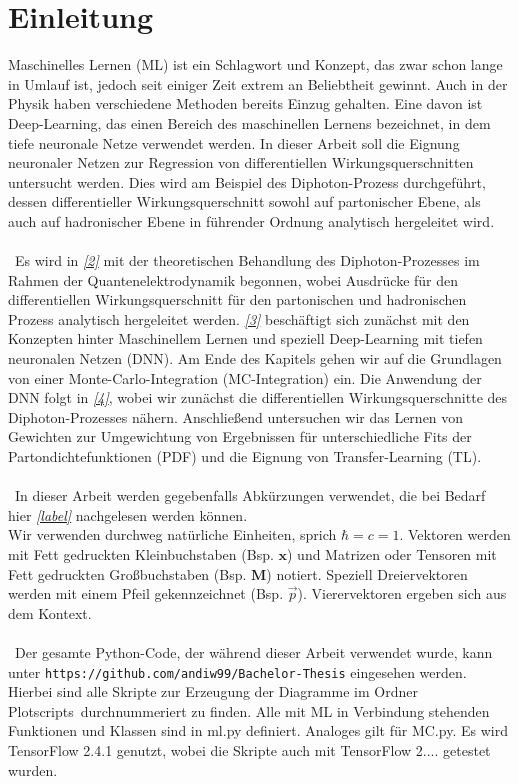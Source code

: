 
%
%
\chapter{Einleitung}
Maschinelles Lernen (ML) ist ein Schlagwort und Konzept, das zwar schon lange in Umlauf ist, jedoch seit einiger Zeit extrem an Beliebtheit gewinnt. Auch in der Physik haben verschiedene Methoden bereits Einzug gehalten. Eine davon ist Deep-Learning, das einen Bereich des maschinellen Lernens bezeichnet, in dem tiefe neuronale Netze verwendet werden. In dieser Arbeit soll die Eignung neuronaler Netzen zur Regression von differentiellen Wirkungsquerschnitten untersucht werden. Dies wird am Beispiel des Diphoton-Prozess durchgeführt, dessen differentieller Wirkungsquerschnitt sowohl auf partonischer Ebene, als auch auf hadronischer Ebene in führender Ordnung analytisch hergeleitet wird.\\
\\\
Es wird in \textit{\autoref{2}} mit der theoretischen Behandlung des Diphoton-Prozesses im Rahmen der Quantenelektrodynamik begonnen, wobei Ausdrücke für den differentiellen Wirkungsquerschnitt für den partonischen und hadronischen Prozess analytisch hergeleitet werden. \textit{\autoref{3}} beschäftigt sich zunächst mit den Konzepten hinter Maschinellem Lernen und speziell Deep-Learning mit tiefen neuronalen Netzen (DNN). Am Ende des Kapitels gehen wir auf die Grundlagen von einer Monte-Carlo-Integration (MC-Integration) ein. Die Anwendung der DNN folgt in \textit{\autoref{4}}, wobei wir zunächst die differentiellen Wirkungsquerschnitte des Diphoton-Prozesses nähern. Anschließend untersuchen wir das Lernen von Gewichten zur Umgewichtung von Ergebnissen für unterschiedliche Fits der Partondichtefunktionen (PDF) und die Eignung von Transfer-Learning (TL). \\
\\\
In dieser Arbeit werden gegebenfalls Abkürzungen verwendet, die bei Bedarf hier \textit{\autoref{label}} nachgelesen werden können. \\
Wir verwenden durchweg natürliche Einheiten, sprich $\hbar = c = 1$. Vektoren werden mit Fett gedruckten Kleinbuchstaben (Bsp. $\mathbf{x}$) und Matrizen oder Tensoren mit Fett gedruckten Großbuchstaben (Bsp. $\mathbf{M}$) notiert. Speziell Dreiervektoren werden mit einem Pfeil gekennzeichnet (Bsp. $\vec{p}$). Vierervektoren ergeben sich aus dem Kontext. \\
\\\
Der gesamte Python-Code, der während dieser Arbeit verwendet wurde, kann unter \texttt{https://github.com/andiw99/Bachelor-Thesis} eingesehen werden. Hierbei sind alle Skripte zur Erzeugung der Diagramme im Ordner \glqq Plotscripts\grqq~durchnummeriert zu finden. Alle mit ML in Verbindung stehenden Funktionen und Klassen sind in ml.py definiert. Analoges gilt für MC.py. Es wird TensorFlow 2.4.1 genutzt, wobei die Skripte auch mit TensorFlow 2.... getestet wurden.

